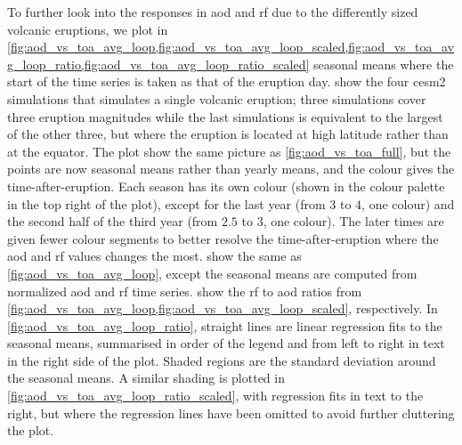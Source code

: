 \documentclass{ametsocV5}
\begin{document}
To further look into the responses in \ac{aod} and \ac{rf} due to the differently sized
volcanic eruptions, we plot in
\cref{fig:aod_vs_toa_avg_loop,fig:aod_vs_toa_avg_loop_scaled,fig:aod_vs_toa_avg_loop_ratio,fig:aod_vs_toa_avg_loop_ratio_scaled}
seasonal means where the start of the time series is taken as that of the eruption day.
 show the four \ac{cesm2} simulations that simulates a
single volcanic eruption; three simulations cover three eruption magnitudes while the
last simulations is equivalent to the largest of the other three, but where the eruption
is located at high latitude rather than at the equator. The plot show the same picture
as \cref{fig:aod_vs_toa_full}, but the points are now seasonal means rather than yearly
means, and the colour gives the time-after-eruption. Each season has its own colour
(shown in the colour palette in the top right of the plot), except for the last year
(from \(3\) to \(4\), one colour) and the second half of the third year (from \(2.5\) to
\(3\), one colour). The later times are given fewer colour segments to better resolve
the time-after-eruption where the \ac{aod} and \ac{rf} values changes the most.
 show the same as \cref{fig:aod_vs_toa_avg_loop},
except the seasonal means are computed from normalized \ac{aod} and \ac{rf} time series.
 show the
\ac{rf} to \ac{aod} ratios from
\cref{fig:aod_vs_toa_avg_loop,fig:aod_vs_toa_avg_loop_scaled}, respectively. In
\cref{fig:aod_vs_toa_avg_loop_ratio}, straight lines are linear regression fits to the
seasonal means, summarised in order of the legend and from left to right in text in the
right side of the plot. Shaded regions are the standard deviation around the seasonal
means. A similar shading is plotted in \cref{fig:aod_vs_toa_avg_loop_ratio_scaled}, with
regression fits in text to the right, but where the regression lines have been omitted
to avoid further cluttering the plot.

\end{document}
